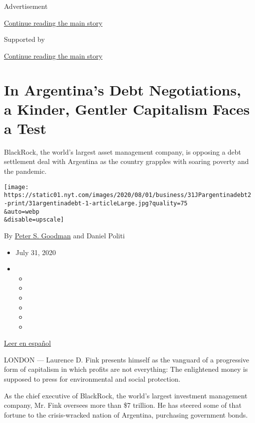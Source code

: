 Advertisement

\protect\hyperlink{after-top}{Continue reading the main story}

Supported by

\protect\hyperlink{after-sponsor}{Continue reading the main story}

\hypertarget{in-argentinas-debt-negotiations-a-kinder-gentler-capitalism-faces-a-test}{%
\section{In Argentina's Debt Negotiations, a Kinder, Gentler Capitalism
Faces a
Test}\label{in-argentinas-debt-negotiations-a-kinder-gentler-capitalism-faces-a-test}}

BlackRock, the world's largest asset management company, is opposing a
debt settlement deal with Argentina as the country grapples with soaring
poverty and the pandemic.

\texttt{[image: https://static01.nyt.com/images/2020/08/01/business/31JPargentinadebt2-print/31argentinadebt-1-articleLarge.jpg?quality=75\\\&auto=webp\\\&disable=upscale]}

By \href{https://www.nytimes.com/by/peter-s-goodman}{Peter S. Goodman}
and Daniel Politi

\begin{itemize}
\item
  July 31, 2020
\item
  \begin{itemize}
  \item
  \item
  \item
  \item
  \item
  \item
  \end{itemize}
\end{itemize}

\href{https://www.nytimes.com/es/2020/07/31/espanol/negocios/argentina-deuda.html}{Leer
en español}

LONDON --- Laurence D. Fink presents himself as the vanguard of a
progressive form of capitalism in which profits are not everything: The
enlightened money is supposed to press for environmental and social
protection.

As the chief executive of BlackRock, the world's largest investment
management company, Mr. Fink oversees more than \$7 trillion. He has
steered some of that fortune to the crisis-wracked nation of Argentina,
purchasing government bonds.

